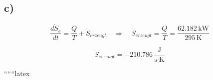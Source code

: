 

\subsection*{c)}

\begin{equation*}
\frac{d\dot{S}_e}{dt} = \frac{Q}{T} + \dot{S}_{erzeugt} \quad \Rightarrow \quad \dot{S}_{erzeugt} = \frac{Q}{T} = \frac{62.182 \, \text{kW}}{295 \, \text{K}}
\end{equation*}

\begin{equation*}
\dot{S}_{erzeugt} = -210.786 \, \frac{\text{J}}{\text{s} \cdot \text{K}}
\end{equation*}

``````latex